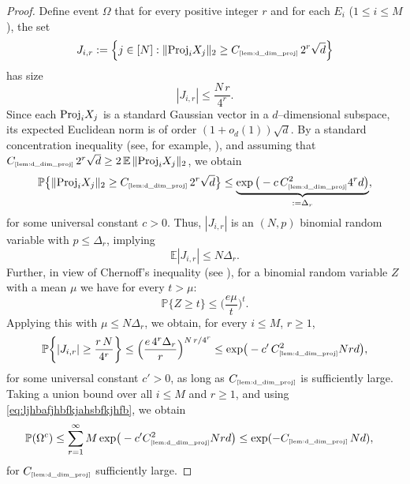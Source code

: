 \documentclass[11pt]{amsart}
\theoremstyle{definition}
\theoremstyle{plain}
\def\Prob{{\mathbb P}}
\def\Prob{{\mathbb P}}
\def\Exp{{\mathbb E}}
\def\Proj{{\rm Proj}}
\newcommand{\tref}[1]{\text{\tiny{\ref{#1}}}}
\begin{document}
\begin{proof}
Define event $\Omega$ that for every positive integer $r$ and for each $E_i$ ($1 \le i \le M$),  
the set
\[
  J_{i,r} := \Big\{ j \in [N] : \|\Proj_{i} X_j\|_2 \ge C_{\tref{lem:d_dim_proj}}\, 2^r \sqrt{d} \Big\}
\]
has size
\[
  |J_{i,r}| \le \frac{N\,r}{4^r}.
\]
Since each $\Proj_{i} X_j$ is a standard Gaussian vector in
a $d$--dimensional subspace, its expected Euclidean norm is of order $(1 + o_d(1)) \sqrt{d}$.  
By a standard concentration inequality (see, for example, \cite{Ver18}), and assuming that $C_{\tref{lem:d_dim_proj}}\, 2^r \sqrt{d}\geq
2\,\Exp\,\|\Proj_{i} X_j\|_2$,
we obtain
\[
  \Prob\big\{
  \|\Proj_{i} X_j\|_2 \ge C_{\tref{lem:d_dim_proj}}\, 2^r \sqrt{d} \big\}
  \le \underbrace{\exp\big(-c\, C_{\tref{lem:d_dim_proj}}^2 4^r d \big)}_{:= \Delta_r},
\]
for some universal constant $c > 0$. Thus, $|J_{i,r}|$ is an
$(N,p)$ binomial random variable with $p\leq\Delta_r$, implying
\[
  \Exp|J_{i,r}| \le N \Delta_r.
\]
Further, in view of
Chernoff’s inequality (see \cite[Section~2.3]{Ver18}), for a binomial random variable $Z$ with a mean
$\mu$
we have for every $t>\mu$:
\[
  \Prob\{Z \ge t\}
  \le \Big(\frac{e\mu}{t}\Big)^t.
\]
Applying this with $\mu \leq N \Delta_r$, we obtain, for every
$i \le M$, $r \ge 1$,
\[
  \Prob\!\left\{ |J_{i,r}| \ge \frac{r\,N}{4^r } \right\}
  \leq
  \Big(\frac{e\,4^r\Delta_r}{r}\Big)^{N\,r/4^r}
  \le \exp\!\big( - c'\, C_{\tref{lem:d_dim_proj}}^2 N r d \big),
\]
for some universal constant $c'>0$,
as long as $C_{\tref{lem:d_dim_proj}}$ is sufficiently large.
Taking a union bound over all $i \le M$ and $r \ge 1$, 
and using \eqref{eq:ljhbafjhbfkjahsbfkjhfb}, we obtain
\begin{align*}
  \Prob(\Omega^c)
  &\le \sum_{r=1}^\infty M \exp\!\big(-c' C_{\tref{lem:d_dim_proj}}^2 N r d \big)\le \exp(-C_{\tref{lem:d_dim_proj}}\,Nd),
\end{align*}
for $C_{\tref{lem:d_dim_proj}}$ sufficiently large.

\medskip


\end{proof}
\end{document}
